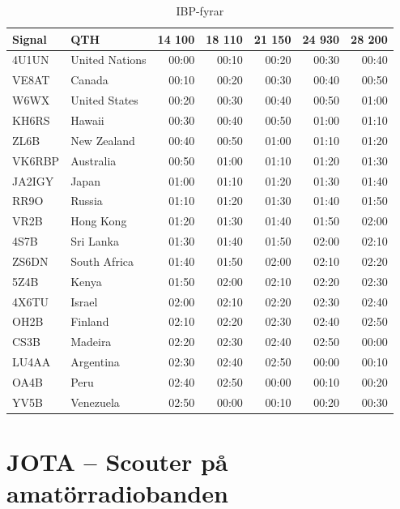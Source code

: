 {\begin{table}[H]
\centering
\begin{tabular}{llrrrrr}
\textbf{Signal} & \textbf{QTH} & \textbf{14 100} & \textbf{18 110} &
                \textbf{21 150} & \textbf{24 930} & \textbf{28 200} \\ \hline
4U1UN  & United Nations & 00:00  & 00:10  & 00:20  & 00:30  & 00:40  \\
VE8AT  & Canada         & 00:10  & 00:20  & 00:30  & 00:40  & 00:50  \\
W6WX   & United States  & 00:20  & 00:30  & 00:40  & 00:50  & 01:00  \\
KH6RS  & Hawaii         & 00:30  & 00:40  & 00:50  & 01:00  & 01:10  \\
ZL6B   & New Zealand    & 00:40  & 00:50  & 01:00  & 01:10  & 01:20  \\
VK6RBP & Australia      & 00:50  & 01:00  & 01:10  & 01:20  & 01:30  \\
JA2IGY & Japan          & 01:00  & 01:10  & 01:20  & 01:30  & 01:40  \\
RR9O   & Russia         & 01:10  & 01:20  & 01:30  & 01:40  & 01:50  \\
VR2B   & Hong Kong      & 01:20  & 01:30  & 01:40  & 01:50  & 02:00  \\
4S7B   & Sri Lanka      & 01:30  & 01:40  & 01:50  & 02:00  & 02:10  \\
ZS6DN  & South Africa   & 01:40  & 01:50  & 02:00  & 02:10  & 02:20  \\
5Z4B   & Kenya          & 01:50  & 02:00  & 02:10  & 02:20  & 02:30  \\
4X6TU  & Israel         & 02:00  & 02:10  & 02:20  & 02:30  & 02:40  \\
OH2B   & Finland        & 02:10  & 02:20  & 02:30  & 02:40  & 02:50  \\
CS3B   & Madeira        & 02:20  & 02:30  & 02:40  & 02:50  & 00:00  \\
LU4AA  & Argentina      & 02:30  & 02:40  & 02:50  & 00:00  & 00:10  \\
OA4B   & Peru           & 02:40  & 02:50  & 00:00  & 00:10  & 00:20  \\
YV5B   & Venezuela      & 02:50  & 00:00  & 00:10  & 00:20  & 00:30  \\
\end{tabular}
\caption{IBP-fyrar}
\end{table}

\normalsize

\section{JOTA -- Scouter på amatörradiobanden}

}
